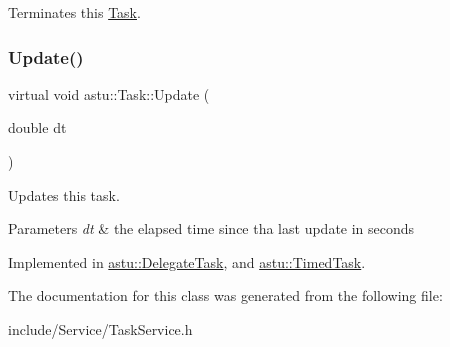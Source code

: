 Terminates this \hyperlink{classastu_1_1Task}{Task}. \mbox{\label{classastu_1_1Task_a2bcec3cc42b46cfcb03422e029577c0a}} 
\subsubsection{\texorpdfstring{Update()}{Update()}}
{\footnotesize\ttfamily virtual void astu\+::\+Task\+::\+Update (\begin{DoxyParamCaption}\item[{double}]{dt }\end{DoxyParamCaption})\hspace{0.3cm}{\ttfamily [pure virtual]}}

Updates this task.


\begin{DoxyParams}{Parameters}
{\em dt} & the elapsed time since tha last update in seconds \\
\hline
\end{DoxyParams}


Implemented in \hyperlink{classastu_1_1DelegateTask_a48755ab30194963c37e22ed118423704}{astu\+::\+Delegate\+Task}, and \hyperlink{classastu_1_1TimedTask_a5e850f0352294d2c9b302e1a56c6eb09}{astu\+::\+Timed\+Task}.



The documentation for this class was generated from the following file\+:\begin{DoxyCompactItemize}
\item 
include/\+Service/Task\+Service.\+h\end{DoxyCompactItemize}
